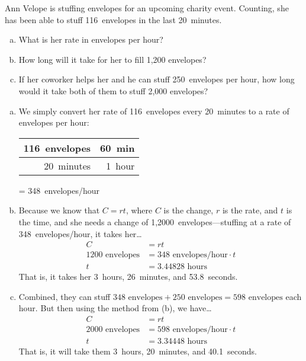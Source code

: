 \documentclass[11pt,letterpaper]{article}
\begin{document}
\newpage



 Ann Velope is stuffing envelopes for an upcoming charity event. Counting, she has been able to stuff 116~envelopes in the last 20~minutes. 
	\begin{enumerate}[(a)]
	\item What is her rate in envelopes per hour?
	\item How long will it take for her to fill 1,200 envelopes? 
	\item If her coworker helps her and he can stuff 250~envelopes per hour, how long would it take both of them to stuff 2,000 envelopes? 
	\end{enumerate} \pspace

\sol
\begin{enumerate}[(a)]
\item We simply convert her rate of 116~envelopes every 20~minutes to a rate of envelopes per hour: \par
	\begin{table}[!ht]
	\centering
	\begin{tabular}{r|r}
	116~envelopes & 60~min \\ \hline
	20~minutes	& 1~hour
	\end{tabular}
	= 348~envelopes/hour
	\end{table} \pspace

\item Because we know that $C= rt$, where $C$ is the change, $r$ is the rate, and $t$ is the time, and she needs a change of 1,2000~envelopes---stuffing at a rate of 348~envelopes/hour, it takes her\dots
	\[
	\begin{aligned}
	C&= rt \\[0.3cm]
	1200 \text{ envelopes}&= 348 \text{ envelopes/hour} \cdot t \\[0.3cm]
	t&=  3.44828 \text{ hours}
	\end{aligned}
	\]
That is, it takes her 3~hours, 26~minutes, and 53.8~seconds. \pspace

\item Combined, they can stuff $348 \text{ envelopes} + 250 \text{ envelopes}= 598 \text{ envelopes}$ each hour. But then using the method from (b), we have\dots
	\[
	\begin{aligned}
	C&= rt \\[0.3cm]
	2000 \text{ envelopes}&= 598 \text{ envelopes/hour} \cdot t \\[0.3cm]
	t&=  3.34448 \text{ hours}
	\end{aligned}
	\]
That is, it will take them 3~hours, 20~minutes, and 40.1~seconds. \pspace
\end{enumerate}
\end{document}
